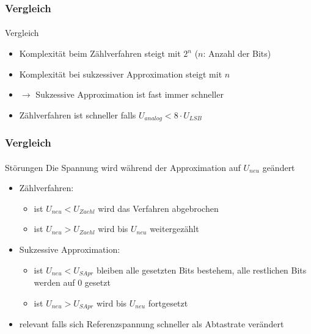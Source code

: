 \begin{frame}
    \frametitle{Vergleich}
    \framesubtitle{}
    \begin{block}{Vergleich}
        \begin{itemize}
            \item Komplexität beim Zählverfahren steigt mit $2^n$ ($n$: Anzahl
            der Bits)
            \item Komplexität bei sukzessiver Approximation steigt mit $n$
            \item $\rightarrow$ Sukzessive Approximation ist fast immer schneller
            \item Zählverfahren ist schneller falls $U_{analog} < 8 \cdot
            U_{LSB}$
        \end{itemize}
    \end{block}
\end{frame}
\begin{frame}
    \frametitle{Vergleich}
    \framesubtitle{}
    \begin{block}{Störungen}
        Die Spannung wird während der Approximation auf $U_{neu}$ geändert
         \begin{itemize}
             \item Zählverfahren:
             \begin{itemize}
                 \item ist $U_{neu} < U_{Zaehl}$ wird das Verfahren abgebrochen
                 \item ist $U_{neu} > U_{Zaehl}$ wird bis $U_{neu}$
                 weitergezählt
             \end{itemize}
             \item Sukzessive Approximation:
             \begin{itemize}
                 \item ist $U_{neu} < U_{SApr}$ bleiben alle gesetzten Bits
                 bestehem, alle restlichen Bits werden auf 0 gesetzt
                 \item ist $U_{neu} > U_{SApr}$ wird bis $U_{neu}$ fortgesetzt
             \end{itemize}
             \item relevant falls sich Referenzspannung schneller als
             Abtastrate verändert
         \end{itemize}
    \end{block}
\end{frame}

